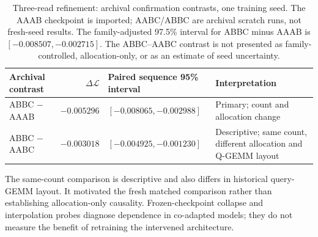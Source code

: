 \documentclass[11pt,letterpaper]{article}
\newcommand{\route}[1]{\textsf{#1}}
\newcommand{\Loss}{\mathcal{L}}
\newcommand{\DeltaABBC}{-0.005296}
\newcommand{\LowABBC}{-0.008065}
\newcommand{\HighABBC}{-0.002988}
\newcommand{\FamilyLowABBC}{-0.008507}
\newcommand{\FamilyHighABBC}{-0.002715}
\newcommand{\DeltaSameCount}{-0.003018}
\newcommand{\LowSameCount}{-0.004925}
\newcommand{\HighSameCount}{-0.001230}
\begin{document}
\begin{table}[!ht]
\centering
\small
\begin{tabularx}{\textwidth}{@{}lrlY@{}}
\toprule
Archival contrast & $\Delta\Loss$ & Paired sequence 95\% interval & Interpretation \\
\midrule
\route{ABBC} $-$ \route{AAAB} & $\DeltaABBC$ & $[\LowABBC,\HighABBC]$ & Primary; count and allocation change \\
\route{ABBC} $-$ \route{AABC} & $\DeltaSameCount$ & $[\LowSameCount,\HighSameCount]$ & Descriptive; same count, different allocation and Q-GEMM layout \\
\bottomrule
\end{tabularx}
\caption{Three-read refinement: archival confirmation contrasts, one training seed. The
\route{AAAB} checkpoint is imported; \route{AABC}/\route{ABBC} are archival
scratch runs, not fresh-seed results. The
family-adjusted 97.5\% interval for \route{ABBC} minus \route{AAAB} is
$[\FamilyLowABBC,\FamilyHighABBC]$. The \route{ABBC}--\route{AABC} contrast is
not presented as family-controlled, allocation-only, or as an estimate of seed
uncertainty.}
\label{tab:three}
\end{table}
The same-count comparison is descriptive and also differs in historical
query-GEMM layout. It motivated the fresh matched comparison rather than
establishing allocation-only causality. Frozen-checkpoint collapse and
interpolation probes diagnose dependence in co-adapted models; they do not
measure the benefit of retraining the intervened architecture.
\end{document}
